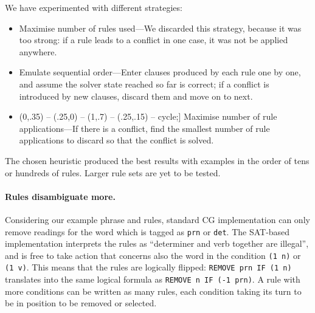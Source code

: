 \documentclass[11pt]{article}
\newcommand{\todo}[1]{{\color{cyan}\textbf{[TODO: }#1\textbf{]}}}
\def\checkmark{\tikz\fill[scale=0.4](0,.35) -- (.25,0) -- (1,.7) -- (.25,.15) -- cycle;}
\begin{document}
We have experimented with different strategies:
\begin{itemize}
\item Maximise
number of rules used---We discarded this strategy, because it was too strong: if a rule leads to a conflict in one case, it was not be applied anywhere.
\item Emulate sequential order---Enter clauses produced by each rule one by one, and assume the solver state reached so far is correct; if a conflict is introduced by new clauses, discard them and move on to next.
\item [\checkmark] Maximise number of rule applications---If there is a conflict, find the smallest number of rule applications to discard so that the conflict is solved.
\end{itemize}
The chosen heuristic produced the best results with examples in the order of tens or hundreds of rules.
Larger rule sets are yet to be tested.


\paragraph{Rules disambiguate more.}
Considering our example phrase and rules, standard CG implementation
can only remove readings for the word which is tagged as \texttt{prn} or
\texttt{det}. The SAT-based implementation interprets the rules as
``determiner and verb together are illegal'', and is free to take action that concerns also the word in the condition \texttt{(1 n)} or \texttt{(1 v)}.
This means that the rules are logically flipped: \texttt{REMOVE prn IF
  (1 n)} translates into the same logical formula as  \texttt{REMOVE n
  IF (-1 prn)}. A rule with more conditions can be written as many
rules, each condition taking its turn to be in position to be removed
or selected. \\

\end{document}
